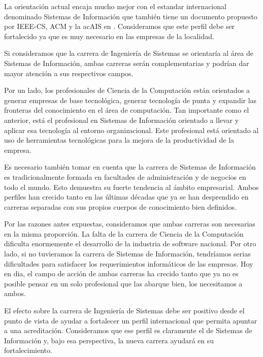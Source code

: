 La orientación actual encaja mucho mejor con el estandar
internacional denominado Sistemas de Información que también tiene
un documento propuesto por IEEE-CS, ACM y la ac{AIS} en
\cite{InformationSystems2002Journal}. Consideramos que este perfil debe ser
fortalecido ya que es muy necesario en las empresas de la localidad.

Si consideramos que la carrera de Ingeniería de Sistemas se
orientaría al área de Sistemas de Información, ambas carreras serán
complementarias y podrían dar mayor atención a sus respectivos
campos.

Por un lado, los profesionales de Ciencia de la Computación están orientados a generar empresas
de base tecnológica, generar tecnología de punta y expandir las
fronteras del conocimiento en el área de computación. Tan importante
como el anterior, está el profesional en Sistemas de Información
orientado a llevar y aplicar esa tecnología al entorno organizacional. Este profesional está orientado al uso de
herramientas tecnológicas para la mejora de la productividad de la empresa.

Es necesario también tomar en cuenta que la carrera de Sistemas de Información es tradicionalmente formada en facultades de administración y de negocios en todo el mundo. Esto demuestra su fuerte tendencia al ámbito empresarial. Ambos perfiles han crecido tanto en las últimas décadas que ya se han desprendido en carreras separadas con sus propios cuerpos de conocimiento bien definidos.

Por las razones antes expuestas, consideramos que ambas carreras son necesarias en la misma proporción. La falta de la carrera de Ciencia de la Computación dificulta enormemente el desarrollo de la industria de software nacional. Por otro lado, si no tuvieramos la carrera de Sistemas de Información, tendríamos serias dificultades para satisfacer los requerimientos informáticos de las empresas. Hoy en dia, el campo de acción de ambas carreras ha crecido tanto que ya no es posible pensar en un solo profesional que las abarque bien, los necesitamos a ambos.

El efecto sobre la carrera de Ingeniería de Sistemas debe ser positivo desde el punto de vista de ayudar a fortalecer un perfil internacional que permita apuntar a una acreditación. Consideramos que ese perfil es claramente el de Sistemas de Información y, bajo esa perspectiva, la nueva carrera ayudará en su fortalecimiento.